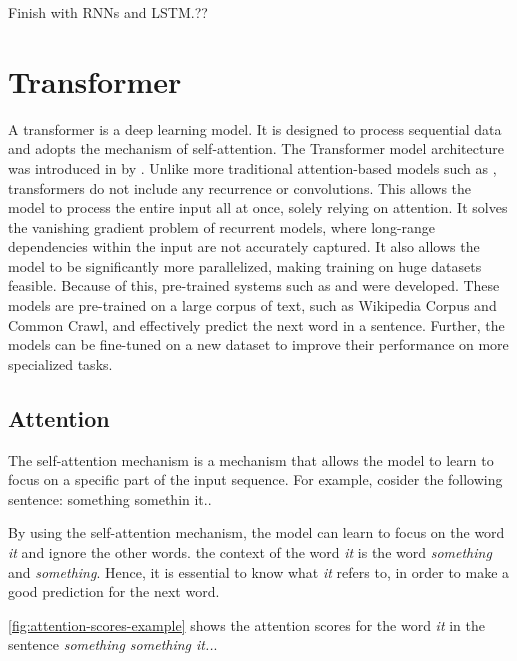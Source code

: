 Finish with RNNs and LSTM.??

\section{Transformer}
\label{sec:transformer}
A transformer is a deep learning model. It is designed to process sequential data and adopts the mechanism of self-attention. The Transformer model architecture was introduced in \citeyear{vaswani2017attention} by \textcite{vaswani2017attention}. Unlike more traditional attention-based models such as , transformers do not include any recurrence or convolutions. This allows the model to process the entire input all at once, solely relying on attention. It solves the vanishing gradient problem of recurrent models, where long-range dependencies within the input are not accurately captured. It also allows the model to be significantly more parallelized, making training on huge datasets feasible. Because of this, pre-trained systems such as  and  were developed. These models are pre-trained on a large corpus of text, such as Wikipedia Corpus and Common Crawl, and effectively predict the next word in a sentence. Further, the models can be fine-tuned on a new dataset to improve their performance on more specialized tasks.

\subsection{Attention}

The self-attention mechanism is a mechanism that allows the model to learn to focus on a specific part of the input sequence. For example, cosider the following sentence: 
something somethin it..

By using the self-attention mechanism, the model can learn to focus on the word \textit{it} and ignore the other words. the context of the word \textit{it} is the word \textit{something} and \textit{something}. Hence, it is essential to know what \textit{it} refers to, in order to make a good prediction for the next word.

\cref{fig:attention-scores-example} shows the attention scores for the word \textit{it} in the sentence \textit{something something it..}.

